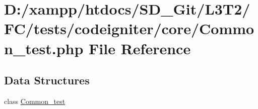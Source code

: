 \hypertarget{_common__test_8php}{}\section{D\+:/xampp/htdocs/\+S\+D\+\_\+\+Git/\+L3\+T2/\+F\+C/tests/codeigniter/core/\+Common\+\_\+test.php File Reference}
\label{_common__test_8php}
\subsection*{Data Structures}
\begin{DoxyCompactItemize}
\item 
class \hyperlink{class_common__test}{Common\+\_\+test}
\end{DoxyCompactItemize}
